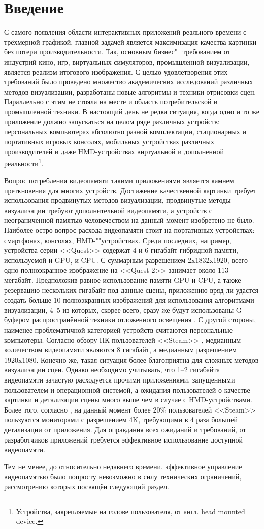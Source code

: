 \section{Введение}
С самого появления области интерактивных приложений реального времени с трёхмерной графикой, главной задачей является максимизация качества картинки без потери производительности.
Так, основным бизнес"=требованием от индустрий кино, игр, виртуальных симуляторов, промышленной визуализации, является реализм итогового изображения.
С целью удовлетворения этих требований было проведено множество академических исследований различных методов визуализации, разработаны новые алгоритмы и техники отрисовки сцен.
Параллельно с этим не стояла на месте и область потребительской и промышленной техники.
В настоящий день не редка ситуация, когда одно и то же приложение должно запускаться на целом ряде различных устройств: персональных компьютерах абсолютно разной комплектации, стационарных и портативных игровых консолях, мобильных устройствах различных производителей и даже HMD-устройствах виртуальной и дополненной реальности\footnote{Устройства, закрепляемые на голове пользователя, от англ. head mounted device.}.

Вопрос потребления видеопамяти такими приложениями является камнем преткновения для многих устройств.
Достижение качественной картинки требует использования продвинутых методов визуализации, продвинутые методы визуализации требуют дополнительной видеопамяти, а устройств с неограниченной памятью человечеством на данный момент изобретено не было.
Наиболее остро вопрос расхода видеопамяти стоит на портативных устройствах: смартфонах, консолях, HMD-""устройствах.
Среди последних, например, устройства серии <<Quest>> содержат 4 и 6 гигабайт гибридной памяти, используемой и GPU, и CPU.
С суммарным разрешением 2x1832x1920, всего одно полноэкранное изображение на <<Quest 2>> занимает около 113 мегабайт.
Предположив равное использование памяти GPU и CPU, а также резервацию нескольких гигабайт под данные сцены, приложению вряд ли удастся создать больше 10 полноэкранных изображений для использования алгоритмами визуализации, 4--5 из которых, скорее всего, сразу же будут использованы G-буфером распространённой техники отложенного освещения \cite{10.1145/378456.378468}.
С другой стороны, наименее проблематичной категорией устройств считаются персональные компьютеры. Согласно обзору ПК пользователей <<Steam>> \cite{steamSurvey2023may}, медианным количеством видеопамяти являются 8 гигабайт, а медианным разрешением 1920x1080. Конечно же, такая ситуация более благоприятна для сложных методов визуализации сцен. Однако необходимо учитывать, что 1--2 гигабайта видеопамяти зачастую расходуется прочими приложениями, запущенными пользователем и операционной системой, а ожидания пользователей о качестве картинки и детализации сцены много выше чем в случае с HMD-устройствами. Более того, согласно \cite{steamSurvey2023may}, на данный момент более 20\% пользователей <<Steam>> пользуются мониторами с разрешением 4K, требующими в 4 раза большей детализации от приложения. Для оправдания всех ожиданий и требований, от разработчиков приложений требуется эффективное использование доступной видеопамяти.

Тем не менее, до относительно недавнего времени, эффективное управление видеопамятью было попросту невозможно в силу технических ограничений, рассмотрению которых посвящён следующий раздел.
